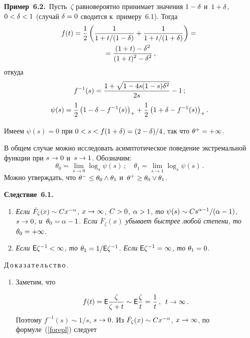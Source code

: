 \begin{multicols}{2}
\noindent
\textbf{Пример~6.2.}\
Пусть~$\zeta$ равновероятно принимает значения $1\hm-\delta$ и~$1\hm+\delta$,
$0\hm<\delta\hm<1$
(случай $\delta\hm=0$ сводится к~примеру~6.1).
Тогда
\begin{multline*}
f(t)=\displaystyle\frac{\displaystyle 1\mathstrut}{\displaystyle 2\mathstrut}\left(\displaystyle\frac{\displaystyle 1\mathstrut}{\displaystyle 1+t/(1-\delta)\mathstrut}+\displaystyle\frac{\displaystyle 1\mathstrut}{\displaystyle 1+t/(1+\delta)\mathstrut}\right)={}\\
{}=
\displaystyle\frac{\displaystyle (1+t)-\delta^2\mathstrut}{\displaystyle (1+t)^2-\delta^2\mathstrut}\,,
\end{multline*}
откуда
\begin{gather*}
f^{-1}(s)=\displaystyle\frac{\displaystyle 1+\sqrt{1-4s(1-s)\delta^2}\mathstrut}{\displaystyle 2s\mathstrut}-1\,;
\\
\psi(s)=\displaystyle\frac{\displaystyle 1\mathstrut}{\displaystyle 2\mathstrut}\left(1-\delta-f^{-1}(s)\right)_+
+\displaystyle\frac{\displaystyle 1\mathstrut}{\displaystyle 2\mathstrut}\left(1+\delta-f^{-1}(s)\right)_+.
\end{gather*}

Имеем $\psi(s)=0$ при $0\hm<s\hm<f(1+\delta)\hm=(2\hm-\delta)/4$, так что
$\theta^+\hm=+\infty$.

В общем случае можно исследовать асимптотическое поведение
экстремальной функции при
$s\hm\to 0$ и~$s\hm\to 1$. Обозначим:
$$
\theta_0=\lim\limits_{s\to 0}\log_s\psi(s)\,;\quad
\theta_1=\lim\limits_{s\to 1}\log_s\psi(s)\,.
$$
Можно утверждать, что $\theta^-\hm\le \theta_0\wedge \theta_1$
и~$\theta^+\hm\ge \theta_0\vee \theta_1$.

\smallskip

\noindent
\textbf{Следствие~6.1.}
\begin{enumerate}[(1)]
\item \textit{Если ${\bar F}_\zeta(x)\hm\sim Cx^{-\alpha}$, $x\hm\to\infty$,
$C\hm>0$, $\alpha\hm>1$, то
$\psi(s)\hm\sim Cs^{\alpha-1}/(\alpha\hm-1)$, $s\hm\to 0$,
и~$\theta_0\hm=\alpha-1$.
Если ${\bar F}_\zeta(x)$ убывает быстрее любой степени, то} $\theta_0\hm=+\infty$.
\item
\textit{Если ${\sf E}\zeta^{-1}\hm<\infty$, то $\theta_1\hm=1/{\sf E}\zeta^{-1}$.
Если ${\sf E}\zeta^{-1}\hm=\infty$, то} $\theta_1\hm=0$.
\end{enumerate}



\noindent
Д\,о\,к\,а\,з\,а\,т\,е\,л\,ь\,с\,т\,в\,о\,.\ \
\begin{enumerate}[(1)]
\item Заметим, что 

\noindent
$$
f(t)={\sf E}\displaystyle\frac{\displaystyle \zeta\mathstrut}{\displaystyle \zeta+t\mathstrut}\sim {\sf E}\displaystyle\frac{\displaystyle \zeta\mathstrut}{\displaystyle t\mathstrut}=\displaystyle\frac{\displaystyle 1\mathstrut}{\displaystyle t\mathstrut}\,,\enskip 
t\to\infty\,.
$$
Поэтому $f^{-1}(s)\sim {1}/{s}$, $s\hm\to 0$.
Из ${\bar F}_\zeta(x)\hm\sim Cx^{-\alpha}$, $x\hm\to\infty$,
по формуле~(\ref{forepl}) следует 


\end{enumerate}
\end{multicols}
